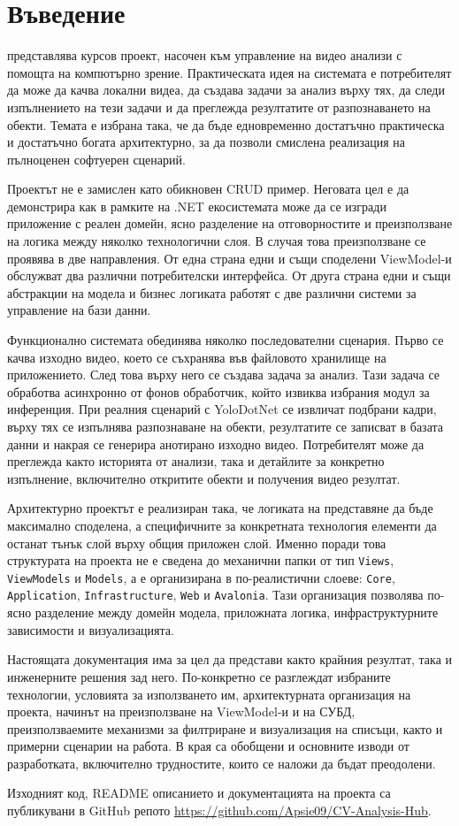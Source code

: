\chapter{Въведение}

\projectname{} представлява курсов проект, насочен към управление на видео анализи с помощта на компютърно зрение. Практическата идея на системата е потребителят да може да качва локални видеа, да създава задачи за анализ върху тях, да следи изпълнението на тези задачи и да преглежда резултатите от разпознаването на обекти. Темата е избрана така, че да бъде едновременно достатъчно практическа и достатъчно богата архитектурно, за да позволи смислена реализация на пълноценен софтуерен сценарий.

Проектът не е замислен като обикновен CRUD пример. Неговата цел е да демонстрира как в рамките на .NET екосистемата може да се изгради приложение с реален домейн, ясно разделение на отговорностите и преизползване на логика между няколко технологични слоя. В случая това преизползване се проявява в две направления. От една страна едни и същи споделени ViewModel-и обслужват два различни потребителски интерфейса. От друга страна едни и същи абстракции на модела и бизнес логиката работят с две различни системи за управление на бази данни.

Функционално системата обединява няколко последователни сценария. Първо се качва изходно видео, което се съхранява във файловото хранилище на приложението. След това върху него се създава задача за анализ. Тази задача се обработва асинхронно от фонов обработчик, който извиква избрания модул за инференция. При реалния сценарий с YoloDotNet се извличат подбрани кадри, върху тях се изпълнява разпознаване на обекти, резултатите се записват в базата данни и накрая се генерира анотирано изходно видео. Потребителят може да преглежда както историята от анализи, така и детайлите за конкретно изпълнение, включително откритите обекти и получения видео резултат.

Архитектурно проектът е реализиран така, че логиката на представяне да бъде максимално споделена, а специфичните за конкретната технология елементи да останат тънък слой върху общия приложен слой. Именно поради това структурата на проекта не е сведена до механични папки от тип \texttt{Views}, \texttt{ViewModels} и \texttt{Models}, а е организирана в по-реалистични слоеве: \texttt{Core}, \texttt{Application}, \texttt{Infrastructure}, \texttt{Web} и \texttt{Avalonia}. Тази организация позволява по-ясно разделение между домейн модела, приложната логика, инфраструктурните зависимости и визуализацията.

Настоящата документация има за цел да представи както крайния резултат, така и инженерните решения зад него. По-конкретно се разглеждат избраните технологии, условията за използването им, архитектурната организация на проекта, начинът на преизползване на ViewModel-и и на СУБД, преизползваемите механизми за филтриране и визуализация на списъци, както и примерни сценарии на работа. В края са обобщени и основните изводи от разработката, включително трудностите, които се наложи да бъдат преодолени.

Изходният код, README описанието и документацията на проекта са публикувани в GitHub репото \url{https://github.com/Apsie09/CV-Analysis-Hub}.
